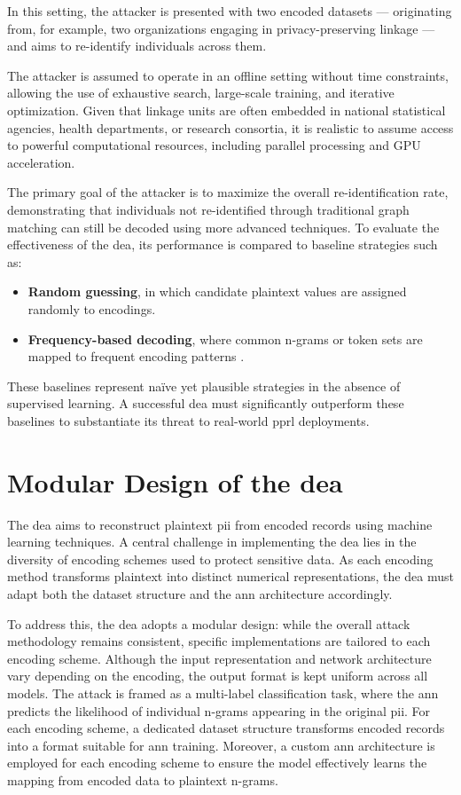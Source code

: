 In this setting, the attacker is presented with two encoded datasets — originating from, for example, two organizations engaging in privacy-preserving linkage — and aims to re-identify individuals across them.

The attacker is assumed to operate in an offline setting without time constraints, allowing the use of exhaustive search, large-scale training, and iterative optimization.
Given that linkage units are often embedded in national statistical agencies, health departments, or research consortia, it is realistic to assume access to powerful computational resources, including parallel processing and GPU acceleration.

The primary goal of the attacker is to maximize the overall re-identification rate, demonstrating that individuals not re-identified through traditional graph matching can still be decoded using more advanced techniques.
To evaluate the effectiveness of the \ac{dea}, its performance is compared to baseline strategies such as:

\begin{itemize}
    \item \textbf{Random guessing}, in which candidate plaintext values are assigned randomly to encodings.
    \item \textbf{Frequency-based decoding}, where common n-grams or token sets are mapped to frequent encoding patterns \cite{herzog2007data}.
\end{itemize}

These baselines represent naïve yet plausible strategies in the absence of supervised learning.
A successful \ac{dea} must significantly outperform these baselines to substantiate its threat to real-world \ac{pprl} deployments.


\section{Modular Design of the \ac{dea}} \label{sec:designandimplementation}

The \ac{dea} aims to reconstruct plaintext \ac{pii} from encoded records using machine learning techniques.
A central challenge in implementing the \ac{dea} lies in the diversity of encoding schemes used to protect sensitive data.
As each encoding method transforms plaintext into distinct numerical representations, the \ac{dea} must adapt both the dataset structure and the \ac{ann} architecture accordingly.

To address this, the \ac{dea} adopts a modular design: while the overall attack methodology remains consistent, specific implementations are tailored to each encoding scheme.
Although the input representation and network architecture vary depending on the encoding, the output format is kept uniform across all models.
The attack is framed as a multi-label classification task, where the \ac{ann} predicts the likelihood of individual n-grams appearing in the original \ac{pii}.
For each encoding scheme, a dedicated dataset structure transforms encoded records into a format suitable for \ac{ann} training.
Moreover, a custom \ac{ann} architecture is employed for each encoding scheme to ensure the model effectively learns the mapping from encoded data to plaintext n-grams.

